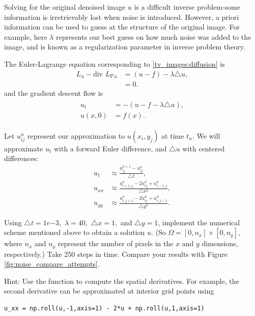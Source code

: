 Solving for the original denoised image $u$ is a difficult inverse problem-some information is irretrievably lost when noise is introduced. However, a priori information can be used to guess at the structure of the original image.  For example, here $\lambda$ represents our best guess on how much noise was added to the image, and is known as a regularization parameter in inverse problem theory. 

The Euler-Lagrange equation corresponding to \eqref{tv_images:diffusion} is
\begin{align*}
L_u - \text{div } L_{\nabla u} &= (u-f) - \lambda \triangle u,\\
&= 0.
\end{align*}
and the gradient descent flow is 
\begin{align}
	\begin{split}
u_t &= -(u-f -\lambda \triangle u),\\
u(x,0) &= f(x).	
	\end{split} \label{tv_images:diffusion_flow}
\end{align}

Let $u_{ij}^n$ represent our approximation to $u(x_i,y_j)$ at time $t_n$. We will approximate $u_t$ with a forward Euler difference, and $\triangle u$ with centered differences: 
\begin{align*}
	u_t &\approx \frac{u_{ij}^{n+1}-u_{ij}^n}{\triangle t},\\
	u_{xx} &\approx \frac{u_{i+1,j}^{n}-2u_{ij}^n + u_{i-1,j}^n}{\triangle x^2}, \\
	u_{yy} &\approx \frac{u_{i,j+1}^{n}-2u_{ij}^n + u_{i,j-1}^n}{\triangle y^2}.
\end{align*}


\begin{problem}
Using $\triangle t = 1e{-3},$ $\lambda = 40,$ $\triangle x = 1,$ and $\triangle y = 1$, implement the numerical scheme mentioned above to obtain a solution $u$. (So $\Omega = [0,n_x]\times [0,n_y]$, where $n_x$ and $n_y$ represent the number of pixels in the $x$ and $y$ dimensions, respectively.) Take 250 steps in time. Compare your results with Figure \ref{fig:noise_compare_attempts}.

Hint: Use the function  to compute the spatial derivatives. For example, the second derivative can be approximated at interior grid points using 
\begin{lstlisting}
u_xx = np.roll(u,-1,axis=1) - 2*u + np.roll(u,1,axis=1)	
\end{lstlisting}
\end{problem}




